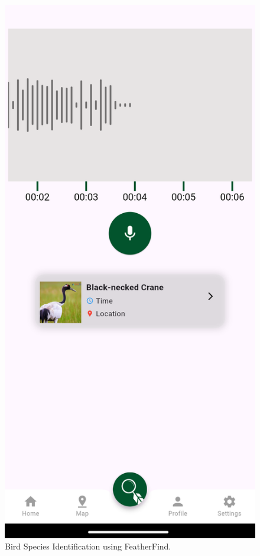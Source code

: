 \begin{figure}[h!]
    \centering
    \includegraphics[scale=0.18]{images/Identified.png}
    \caption{Bird Species Identification using FeatherFind.}
\end{figure}


